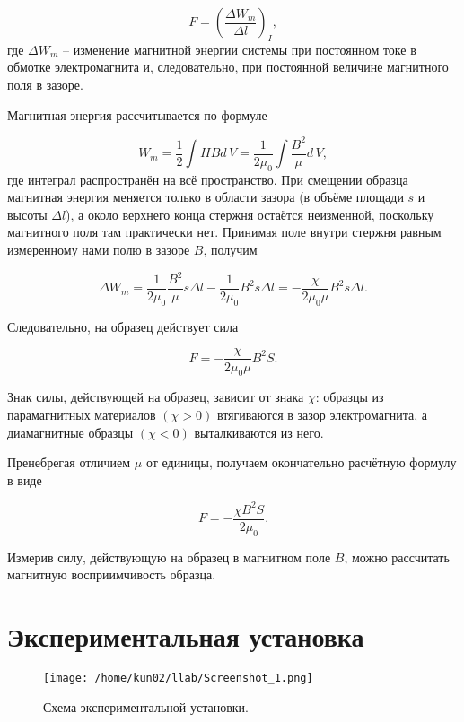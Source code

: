 \documentclass[a4paper]{article}
\begin{document}
\begin{equation}\label{1}
	F = \left(\frac{\Delta W_m}{\Delta l}\right)_I,
\end{equation}
где $ \Delta W_m $ -- изменение магнитной энергии системы при постоянном токе
в обмотке электромагнита и, следовательно, при постоянной величине
магнитного поля в зазоре.

Магнитная энергия рассчитывается по формуле

\begin{equation}\label{2}
	W_m=\frac{1}{2}\int HBd\,V = \frac{1}{2\mu_0}\int\frac{B^2}{\mu}d\,V,
\end{equation}
где интеграл распространён на всё пространство. При смещении образца магнитная энергия меняется только в области зазора (в объёме площади $ s $ и высоты $ \Delta l $), а около верхнего конца стержня остаётся неизменной, поскольку магнитного поля там практически нет. Принимая поле внутри стержня равным измеренному нами полю в зазоре $ B $, получим

\begin{equation}\label{3}
	\Delta W_m=\frac{1}{2\mu_0}\frac{B^2}{\mu}s\Delta l - \frac{1}{2\mu_0}B^2 s\Delta l = -\frac{\chi}{2\mu_0\mu}B^2s\Delta l.
\end{equation}

Следовательно, на образец действует сила

\begin{equation}\label{4}
	F = -\frac{\chi}{2\mu_0\mu}B^2S.
\end{equation}

Знак силы, действующей на образец, зависит от знака $ \chi $: образцы из парамагнитных материалов $( \chi  > 0)$ втягиваются в зазор электромагнита, а диамагнитные образцы $ (\chi < 0) $ выталкиваются из него.

Пренебрегая отличием $ \mu $ от единицы, получаем окончательно расчётную формулу в виде

\begin{equation}\label{5}
	F = -\frac{\chi B^2S}{2\mu_0}.
\end{equation}

Измерив силу, действующую на образец в магнитном поле $ B $, можно рассчитать магнитную восприимчивость образца.

\section{Экспериментальная установка}

\begin{figure}[h!]
	\centering
	\texttt{[image: /home/kun02/llab/Screenshot\_1.png]}
	\caption{Схема экспериментальной установки.}
	\label{pic:1}
\end{figure}
\end{document}
